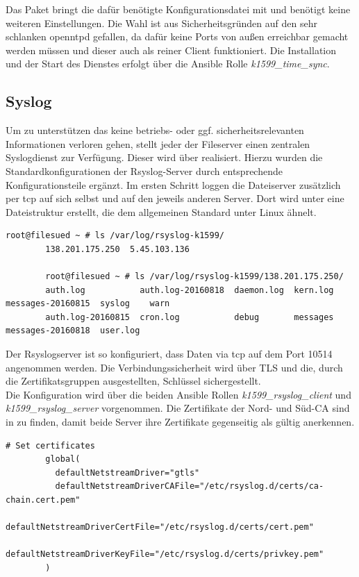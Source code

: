 Das Paket  bringt die dafür benötigte Konfigurationsdatei mit und benötigt keine weiteren Einstellungen. Die Wahl ist aus Sicherheitsgründen auf den sehr schlanken openntpd gefallen, da dafür keine Ports von außen erreichbar gemacht werden müssen und dieser auch als reiner Client funktioniert. Die Installation und der Start des Dienstes erfolgt über die Ansible Rolle \textit{k1599\_time\_sync}.

\subsection{Syslog}
Um zu unterstützen das keine betriebs- oder ggf. sicherheitsrelevanten Informationen verloren gehen, stellt jeder der Fileserver einen zentralen Syslogdienst zur Verfügung. Dieser wird über  realisiert. Hierzu wurden die Standardkonfigurationen der Rsyslog-Server durch entsprechende Konfigurationsteile ergänzt. Im ersten Schritt loggen die Dateiserver zusätzlich per tcp auf sich selbst und auf den jeweils anderen Server. Dort wird unter  eine Dateistruktur erstellt, die dem allgemeinen Standard unter Linux ähnelt.

\begin{lstlisting}[label=code:syslog,caption=Syslog Dateien]
        root@filesued ~ # ls /var/log/rsyslog-k1599/
        138.201.175.250  5.45.103.136

        root@filesued ~ # ls /var/log/rsyslog-k1599/138.201.175.250/
        auth.log           auth.log-20160818  daemon.log  kern.log  messages-20160815  syslog    warn
        auth.log-20160815  cron.log           debug       messages  messages-20160818  user.log
\end{lstlisting}

Der Rsyslogserver ist so konfiguriert, dass Daten via tcp auf dem Port 10514
angenommen werden. Die Verbindungssicherheit wird über TLS und die, durch die
Zertifikatsgruppen ausgestellten, Schlüssel sichergestellt.\\

Die Konfiguration wird über die beiden Ansible Rollen \textit{k1599\_rsyslog\_client} und
\textit{k1599\_rsyslog\_server} vorgenommen. Die Zertifikate der Nord- und Süd-CA sind in  zu finden, damit beide Server ihre Zertifikate gegenseitig als gültig anerkennen.

\begin{lstlisting}[label=code:syslog2,caption=Auszug aus \_rsyslog\_server/templates/etc/rsyslog.d/30\_imtcp\_remote\_input.conf.j2]
        # Set certificates
        global(
          defaultNetstreamDriver="gtls"
          defaultNetstreamDriverCAFile="/etc/rsyslog.d/certs/ca-chain.cert.pem"
          defaultNetstreamDriverCertFile="/etc/rsyslog.d/certs/cert.pem"
          defaultNetstreamDriverKeyFile="/etc/rsyslog.d/certs/privkey.pem"
        )
\end{lstlisting}

